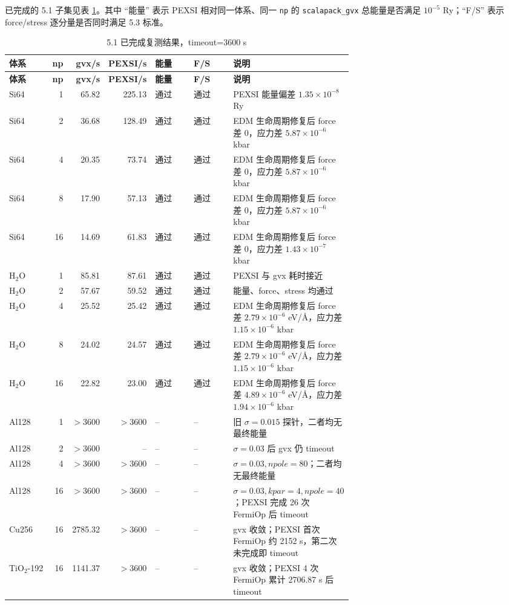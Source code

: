 \documentclass[a4paper,11pt]{article}
\newcommand{\code}[1]{\texttt{#1}}
\begin{document}
已完成的 5.1 子集见表 \ref{tab:sec51-results}。其中 ``能量'' 表示 PEXSI 相对同一体系、同一 \code{np} 的 \code{scalapack\_gvx} 总能量是否满足 \(10^{-5}\) Ry；``F/S'' 表示 force/stress 逐分量是否同时满足 5.3 标准。

{\scriptsize
\begin{longtable}{@{}p{0.13\linewidth}r r r p{0.12\linewidth}p{0.12\linewidth}p{0.29\linewidth}@{}}
\caption{5.1 已完成复测结果，timeout=3600 s}
\label{tab:sec51-results}\\
\toprule
\textbf{体系} & \textbf{np} & \textbf{gvx/s} & \textbf{PEXSI/s} & \textbf{能量} & \textbf{F/S} & \textbf{说明}\\
\midrule
\endfirsthead
\toprule
\textbf{体系} & \textbf{np} & \textbf{gvx/s} & \textbf{PEXSI/s} & \textbf{能量} & \textbf{F/S} & \textbf{说明}\\
\midrule
\endhead
Si64 & 1 & 65.82 & 225.13 & 通过 & 通过 & PEXSI 能量偏差 \(1.35\times10^{-8}\) Ry\\
Si64 & 2 & 36.68 & 128.49 & 通过 & 通过 & EDM 生命周期修复后 force 差 0，应力差 \(5.87\times10^{-6}\) kbar\\
Si64 & 4 & 20.35 & 73.74 & 通过 & 通过 & EDM 生命周期修复后 force 差 0，应力差 \(5.87\times10^{-6}\) kbar\\
Si64 & 8 & 17.90 & 57.13 & 通过 & 通过 & EDM 生命周期修复后 force 差 0，应力差 \(5.87\times10^{-6}\) kbar\\
Si64 & 16 & 14.69 & 61.83 & 通过 & 通过 & EDM 生命周期修复后 force 差 0，应力差 \(1.43\times10^{-7}\) kbar\\
H\(_2\)O & 1 & 85.81 & 87.61 & 通过 & 通过 & PEXSI 与 gvx 耗时接近\\
H\(_2\)O & 2 & 57.67 & 59.52 & 通过 & 通过 & 能量、force、stress 均通过\\
H\(_2\)O & 4 & 25.52 & 25.42 & 通过 & 通过 & EDM 生命周期修复后 force 差 \(2.79\times10^{-6}\) eV/\AA，应力差 \(1.15\times10^{-6}\) kbar\\
H\(_2\)O & 8 & 24.02 & 24.57 & 通过 & 通过 & EDM 生命周期修复后 force 差 \(2.79\times10^{-6}\) eV/\AA，应力差 \(1.15\times10^{-6}\) kbar\\
H\(_2\)O & 16 & 22.82 & 23.00 & 通过 & 通过 & EDM 生命周期修复后 force 差 \(4.89\times10^{-6}\) eV/\AA，应力差 \(1.94\times10^{-6}\) kbar\\
Al128 & 1 & \(>3600\) & \(>3600\) & -- & -- & 旧 \(\sigma=0.015\) 探针，二者均无最终能量\\
Al128 & 2 & \(>3600\) & -- & -- & -- & \(\sigma=0.03\) 后 gvx 仍 timeout\\
Al128 & 4 & \(>3600\) & \(>3600\) & -- & -- & \(\sigma=0.03,npole=80\)；二者均无最终能量\\
Al128 & 16 & \(>3600\) & \(>3600\) & -- & -- & \(\sigma=0.03,kpar=4,npole=40\)；PEXSI 完成 26 次 FermiOp 后 timeout\\
Cu256 & 16 & 2785.32 & \(>3600\) & -- & -- & gvx 收敛；PEXSI 首次 FermiOp 约 2152 s，第二次未完成即 timeout\\
TiO\(_2\)-192 & 16 & 1141.37 & \(>3600\) & -- & -- & gvx 收敛；PEXSI 4 次 FermiOp 累计 2706.87 s 后 timeout\\
\bottomrule
\end{longtable}
}
\end{document}
